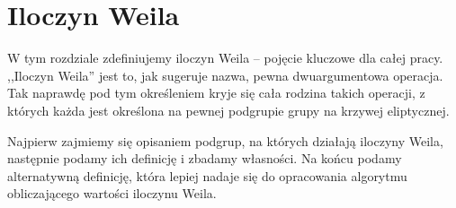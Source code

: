 \chapter{Iloczyn Weila}

W tym rozdziale zdefiniujemy iloczyn Weila -- pojęcie kluczowe dla całej pracy.
,,Iloczyn Weila'' jest to, jak sugeruje nazwa, pewna dwuargumentowa operacja.
Tak naprawdę pod tym określeniem kryje się cała rodzina takich operacji,
z których każda jest określona na pewnej podgrupie
grupy na krzywej eliptycznej.

Najpierw zajmiemy się opisaniem podgrup, na których działają iloczyny Weila,
następnie podamy ich definicję i zbadamy własności.
Na końcu podamy alternatywną definicję,
która lepiej nadaje się do opracowania algorytmu obliczającego
wartości iloczynu Weila.






